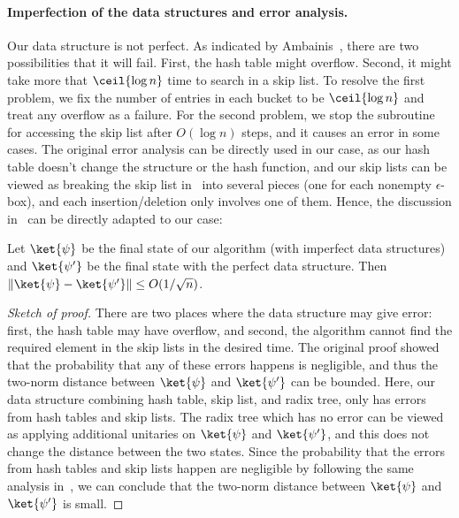 \paragraph{Imperfection of the data structures and error analysis.}
Our data structure is not perfect. As indicated by Ambainis~\cite{r5}, there are two possibilities that it will fail. First, the hash table might overflow. Second, it might take more that $\ceil{\log n}$ time to search in a skip list. To resolve the first problem, we fix the number of entries in each bucket to be $\ceil{\log n}$ and treat any overflow as a failure. For the second problem, we stop the subroutine for accessing the skip list after $O(\log n)$ steps, and it causes an error in some cases. The original error analysis can be directly used in our case, as our hash table doesn't change the structure or the hash function, and our skip lists can be viewed as breaking the skip list in~\cite{r5} into several pieces (one for each nonempty $\epsilon$-box), and each insertion/deletion only involves one of them. Hence, the discussion in~\cite[Section 6]{r5} can be directly adapted to our case: 
\begin{lemma}
  \label{lemma:dt-error}
  Let $\ket{\psi}$ be the final state of our algorithm (with imperfect data structures) and $\ket{\psi'}$ be the final state with the perfect data structure. Then $\|\ket{\psi} - \ket{\psi'}\| \leq O(1/\sqrt{n})$.
\end{lemma}
\begin{proof}[Sketch of proof]
There are two places where the data structure may give error: first, the hash table may have overflow, and second, the algorithm cannot find the required element in the skip lists in the desired time. The original proof showed that the probability that any of these errors happens is negligible, and thus the two-norm distance between $\ket{\psi}$ and $\ket{\psi'}$ can be bounded. Here, our data structure combining hash table, skip list, and radix tree, only has errors from hash tables and skip lists. The radix tree which has no error can be viewed as applying additional unitaries on $\ket{\psi}$ and $\ket{\psi'}$, and this does not change the distance between the two states. Since the probability that the errors from hash tables and skip lists happen are negligible by following the same analysis in~\cite{r5}, we can conclude that the two-norm distance between $\ket{\psi}$ and $\ket{\psi'}$ is small.  
\end{proof}

